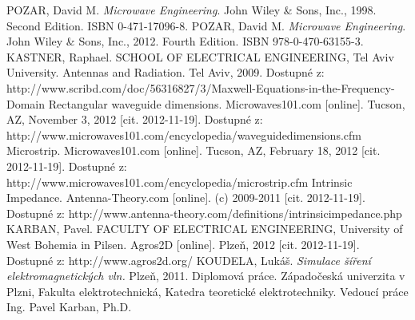 \documentclass[12pt,a4paper,oneside]{article}
\numberwithin{equation}{section} %
\numberwithin{figure}{section} %
\numberwithin{table}{section} %
\begin{document}
\newpage
{} %
\begin{thebibliography}{10}

 POZAR, David M. \textit{Microwave Engineering}. John Wiley \& Sons, Inc., 1998. Second Edition. ISBN 0-471-17096-8.
 POZAR, David M. \textit{Microwave Engineering}. John Wiley \& Sons, Inc., 2012. Fourth Edition. ISBN 978-0-470-63155-3.
 KASTNER, Raphael. SCHOOL OF ELECTRICAL ENGINEERING, Tel Aviv University. Antennas and Radiation. Tel Aviv, 2009. Dostupné z: http://www.scribd.com/doc/56316827/3/Maxwell-Equations-in-the-Frequency-Domain
 Rectangular waveguide dimensions. Microwaves101.com [online]. Tucson, AZ, November 3, 2012 [cit. 2012-11-19]. Dostupné z: http://www.microwaves101.com/encyclopedia/waveguidedimensions.cfm
 Microstrip. Microwaves101.com [online]. Tucson, AZ, February 18, 2012 [cit. 2012-11-19]. Dostupné z: http://www.microwaves101.com/encyclopedia/microstrip.cfm
 Intrinsic Impedance. Antenna-Theory.com [online]. (c) 2009-2011 [cit. 2012-11-19]. Dostupné z: http://www.antenna-theory.com/definitions/intrinsicimpedance.php
 KARBAN, Pavel. FACULTY OF ELECTRICAL ENGINEERING, University of West Bohemia in Pilsen. Agros2D [online]. Plzeň, 2012 [cit. 2012-11-19]. Dostupné z: http://www.agros2d.org/
 KOUDELA, Lukáš. \textit{Simulace šíření elektromagnetických vln.} Plzeň, 2011. Diplomová práce. Západočeská univerzita v Plzni, Fakulta elektrotechnická, Katedra teoretické elektrotechniky. Vedoucí práce Ing. Pavel Karban, Ph.D.


\end{thebibliography}

\newpage
{} %
\setlength{\parskip}{0ex}%
\listoffigures

\newpage
{} %
\listoftables

\newpage
\pagestyle{empty} %
\setcounter{page}{1} %
\appendix %
\end{document}
